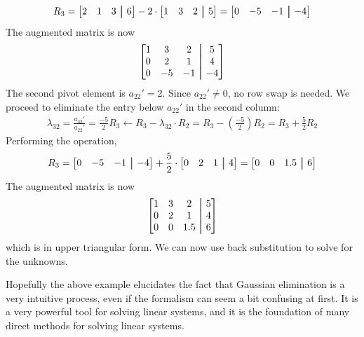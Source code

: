 \begin{exampleBox}
    \begin{equation*}
        R_3 = \begin{bmatrix} 2 & 1 & 3 &\aug& 6 \end{bmatrix} - 2 \cdot \begin{bmatrix} 1 & 3 & 2 &\aug& 5 \end{bmatrix} = \begin{bmatrix} 0 & -5 & -1 &\aug& -4 \end{bmatrix}
    \end{equation*}
    The augmented matrix is now
    \begin{equation*}
        \begin{bmatrix}
            1 & 3 & 2 &\aug& 5 \\
            0 & 2 & 1 &\aug& 4 \\
            0 & -5 & -1 &\aug& -4
        \end{bmatrix}
    \end{equation*}
    The second pivot element is $ a_{22}' = 2 $. Since $ a_{22}' \neq 0 $, no row swap is needed. We proceed to eliminate the entry below $ a_{22}' $ in the second column:
    \begin{gather*}
        \lambda_{32} = \frac{a_{32}'}{a_{22}'} = \frac{-5}{2}
        R_3 \leftarrow R_3 - \lambda_{32} \cdot R_2 = R_3 - \left( \frac{-5}{2} \right) R_2 = R_3 + \frac{5}{2} R_2
    \end{gather*}
    Performing the operation,
    \begin{equation*}
        R_3 = \begin{bmatrix} 0 & -5 & -1 &\aug& -4 \end{bmatrix} + \frac{5}{2} \cdot \begin{bmatrix} 0 & 2 & 1 &\aug& 4 \end{bmatrix} = \begin{bmatrix} 0 & 0 & 1.5 &\aug& 6 \end{bmatrix}
    \end{equation*}
    The augmented matrix is now
    \begin{equation*}
        \begin{bmatrix}
            1 & 3 & 2 &\aug& 5 \\
            0 & 2 & 1 &\aug& 4 \\
            0 & 0 & 1.5 &\aug& 6
        \end{bmatrix}
    \end{equation*}
    which is in upper triangular form. We can now use back substitution to solve for the unknowns.
\end{exampleBox}
Hopefully the above example elucidates the fact that Gaussian elimination is a very intuitive process, even if the formalism can seem a bit confusing at first. It is a very powerful tool for solving linear systems, and it is the foundation of many direct methods for solving linear systems.

